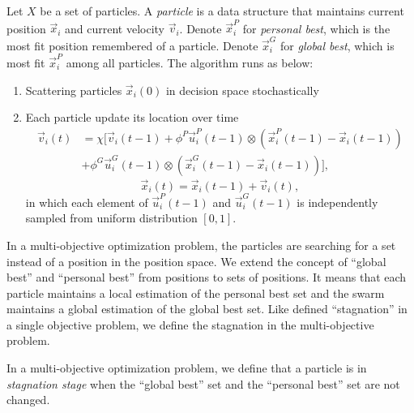\documentclass[12pt]{article}
\begin{document}
\begin{mydef}
\label{def:pso}

Let $ X $ be a set of particles.  
A \emph{particle} is a data structure that maintains current position $ \vec{x}_{i} $ and current velocity  $ \vec{v}_{i} $.
Denote $ \vec{x}^{P}_{i} $ for \emph{personal best}, which is the most fit position remembered of a particle. 
Denote $ \vec{x}^{G}_{i} $ for \emph{global best}, which is most fit $ \vec{x}^{P}_{i} $ among all particles. 
The algorithm runs as below:
\begin{enumerate}
\item Scattering particles $ \vec{x}_{i}(0) $ in decision space stochastically
\item Each particle update its location over time \\
\begin{equation}
\label{eq:up_vel}
\begin{aligned}
\vec{v}_{i}(t) & = \chi [ \vec{v}_{i}(t-1) + \phi^{P} \vec{u}^{P}_{i}(t-1) \otimes (\vec{x}^{P}_{i}(t-1) - \vec{x}_{i}(t-1)) \\
& + \phi^{G} \vec{u}^{G}_{i}(t-1) \otimes (\vec{x}^{G}_{i}(t-1) - \vec{x}_{i}(t-1)) ],
\end{aligned}
\end{equation}
\begin{equation}
\label{eq:up_pos}
\vec{x}_{i}(t) = \vec{x}_{i}(t-1) + \vec{v}_{i}(t),
\end{equation}
in which each element of $ \vec{u}^{P}_{i}(t-1) $ and $ \vec{u}^{G}_{i}(t-1) $ is independently sampled from uniform distribution $ [0, 1] $.
\end{enumerate}
\end{mydef}

In a multi-objective optimization problem, the particles are searching for a set instead of a position in the position space.
We extend the concept of ``global best'' and ``personal best'' from positions to sets of positions.
It means that each particle maintains a local estimation of the personal best set and the swarm maintains a global estimation of the global best set.
Like \cite{clerc2006stagnation} defined ``stagnation'' in a single objective problem, we define the stagnation in the multi-objective problem.
\begin{mydef}
\label{def:mo_stagnation}
In a multi-objective optimization problem, we define that a particle is in \emph{stagnation stage} when the ``global best'' set and the ``personal best'' set are not changed.
\end{mydef}
\end{document}
